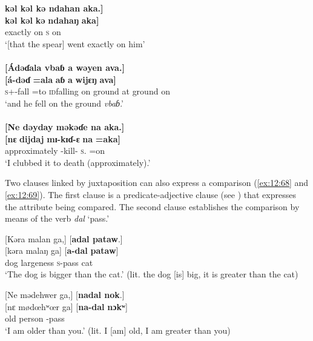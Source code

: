 \medskip
\textbf{kəl  kəl  kə  ndahan  aka.]} \\
\gll \textbf{kəl kəl} \textbf{kə}   \textbf{ndahaŋ}   \textbf{aka]} \\ 
     {exactly}    {on}    \textsc{s}          {on} \\
\glt ‘[that the spear] went exactly on him’  \\

\medskip
\clearpage
{}\\
{}\textbf{[Ádəɗala  vbaɓ  a  wəyen  ava.]}\\
\gll   \textbf{[á-dəɗ}  \textbf{=ala}   \textbf{\dentalflap aɓ}  \textbf{a}  \textbf{wijɛŋ}  \textbf{ava]}\\
    \textsc{s}+{\IFV}-fall  {=to}  {\textsc{id}falling on ground}  {at}  {ground}  {on}  \\
\glt ‘and he fell on the ground \textit{vbaɓ}.’\\

\medskip
{}\\
{}\textbf{[Ne  dəyday  məkəɗe  na  aka.]}\\
\gll  \textbf{[nɛ}   \textbf{dijdaj}   \textbf{mɪ-kɪɗ-ɛ}  \textbf{na}   \textbf{=aka]}\\
    {\oneS}  {approximately}     {\NOM}{}-kill-{\CL}   \textsc{s}.{\DO}   {=on}\\
\glt ‘I clubbed it to death (approximately).’\\
\z  

Two clauses linked by juxtaposition can also express a comparison (\ref{ex:12:68} and \ref{ex:12:69}). The first clause is a predicate-adjective clause (see ) that expresses the attribute being compared. The second clause establishes the comparison by means of the verb \textit{dal} ‘pass.’

\ea \label{ex:12:68}
{}[Kəra  malan  ga,]  [\textbf{adal  pataw}.]\\
\gll  {}[kəra  malaŋ  ga]   [\textbf{a-dal}    \textbf{pataw}]\\
      dog    largeness  {\ADJ}      \textsc{s}-pass  cat\\
\glt  ‘The dog is bigger than the cat.’ (lit. the dog [is] big, it is greater than the cat)
\z 

\ea \label{ex:12:69}
{}[Ne  mədehwer  ga,]  [\textbf{nadal  nok}.]\\
\gll  {}[nɛ  mødœhʷœr  ga]    [\textbf{na-dal}  \textbf{nɔkʷ}]\\
      {\oneS}  {old person}  {\ADJ}    {\oneS}-pass  {\twoS}\\
\glt  ‘I am older than you.’ (lit. I [am] old, I am greater than you)
\z 